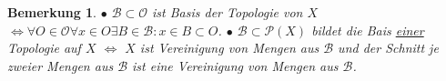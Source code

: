 \documentclass[a4paper,11pt,notitlepage]{report}
\newtheorem{remark}{Bemerkung}[chapter]
\newcommand{\OO}{{\ensuremath{\mathcal{O}}}}
\begin{document}
\begin{remark}
	$\bullet$ $\mathcal{B} \subset \OO$ ist Basis der Topologie von $X$ $\Leftrightarrow \forall O \in \OO \forall x \in O \exists B \in \mathcal{B} \colon x \in B \subset O$.
	\newline
	$\bullet$ $\mathcal{B} \subset \mathcal{P}(X)$ bildet die Bais \underline{einer} Topologie auf $X$ $\Leftrightarrow$ $X$ ist Vereinigung von Mengen aus $\mathcal{B}$ und der Schnitt je zweier Mengen aus $\mathcal{B}$ ist eine Vereinigung von Mengen aus $\mathcal{B}$.
	\newline
	\begin{figure}[h]
		\centering
		\qquad
	\end{figure}
\end{remark}
\end{document}
